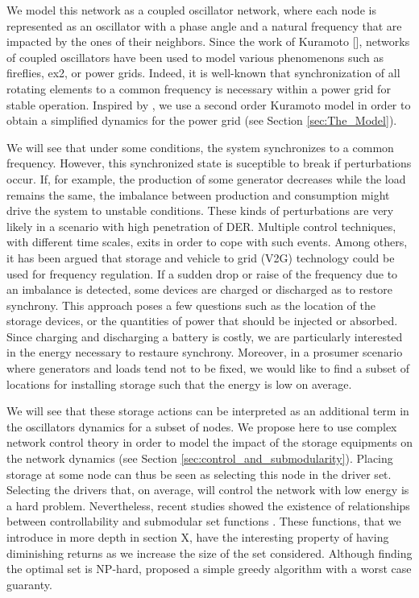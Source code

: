 \documentclass[conference]{IEEEtran}
\begin{document}
We model this network as a coupled oscillator network, where each node is represented as an oscillator with a phase angle and a natural frequency that are impacted by the ones of their neighbors. Since the work of Kuramoto [], networks of coupled oscillators have been used to model various phenomenons such as fireflies, ex2, or power grids. Indeed, it is well-known that synchronization of all rotating elements to a common frequency is necessary within a power grid for stable operation. Inspired by \cite{Filatrella2008}, we use a second order Kuramoto model in order to obtain a simplified dynamics for the power grid (see Section \ref{sec:The_Model}). 
 
We will see that under some conditions, the system synchronizes to a common frequency. However, this synchronized state is suceptible to break if perturbations occur. If, for example, the production of some generator decreases while the load remains the same, the imbalance between production and consumption might drive the system to unstable conditions. These kinds of perturbations are very likely in a scenario with high penetration of DER. Multiple control techniques, with different time scales, exits in order to cope with such events. Among others, it has been argued that storage and vehicle to grid (V2G) technology could be used for frequency regulation. If a sudden drop or raise of the frequency due to an imbalance is detected, some devices are charged or discharged as to restore synchrony. This approach poses a few questions such as the location of the storage devices, or the quantities of power that should be injected or absorbed. Since charging and discharging a battery is costly, we are particularly interested in the energy necessary to restaure synchrony. Moreover, in a prosumer scenario where generators and loads tend not to be fixed, we would like to find a subset of locations for installing storage such that the energy is low on average. 

We will see that these storage actions can be interpreted as an additional term in the oscillators dynamics for a subset of nodes. We propose here to use complex network control theory \cite{Liu2015} in order to model the impact of the storage equipments on the network dynamics (see Section \ref{sec:control_and_submodularity}). Placing storage at some node can thus be seen as selecting this node in the driver set. Selecting the drivers that, on average, will control the network with low energy is a hard problem. Nevertheless, recent studies showed the existence of relationships between controllability and submodular set functions \cite{Summers2014}. These functions, that we introduce in more depth in section X, have the interesting property of having diminishing returns as we increase the size of the set considered. Although finding the optimal set is NP-hard, \cite{Minoux} proposed a simple greedy algorithm with a worst case guaranty. 
\end{document}
